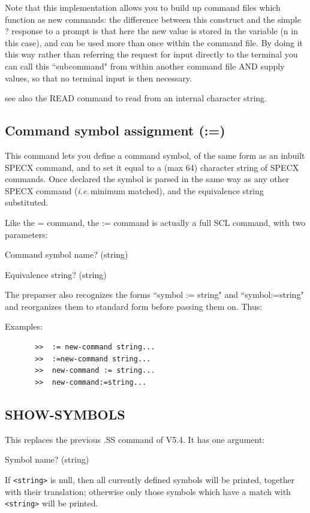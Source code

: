 \documentclass[11pt,twoside]{report}
\newcommand{\ie}{{\it i.e.\,}}
\begin{document}
Note that this implementation allows you to build up command files which
function as new commands: the difference between this construct and the simple
? response to a prompt is that here the new value is stored in the variable (n
in this case), and can be used more than once within the command file. By doing
it this way rather than referring the request for input directly to the
terminal you can call this ``subcommand" from within another command file AND
supply values, so that no terminal input is then necessary.

see also the READ command to read from an internal character string.

\subsection{Command symbol assignment (:=)}\index{:=}

This command lets you define a command symbol, of the same form as an inbuilt
SPECX command, and to set it equal to a (max 64) character string of SPECX
commands. Once declared the symbol is parsed in the same way as any other SPECX
command (\ie minimum matched), and the
equivalence string substituted.

Like the = command, the := command is actually a full SCL command, with two
parameters:
\begin{description}
\item {Command symbol name?}  (string)
\item {Equivalence string?}   (string)
\end{description}
The preparser also recognizes the forms ``symbol :=
string" and ``symbol:=string" and reorganizes them to standard form before
passing them on. Thus:

Examples:
\begin{verbatim}
       >>  := new-command string...
       >>  :=new-command string...
       >>  new-command := string...
       >>  new-command:=string...
\end{verbatim}


\subsection{SHOW-SYMBOLS}

This replaces the previous .SS command of V5.4.
It has one argument:
\begin{description}
\item  {Symbol name?}   (string)
\end{description}
If \verb+<string>+ is null, then all currently defined symbols will be printed,
together with their translation; otherwise only those symbols which have
a match with \verb+<string>+ will be printed.
\end{document}
